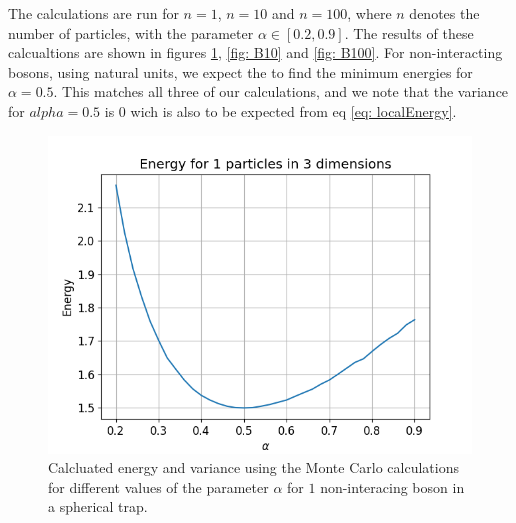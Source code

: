 \documentclass[a4paper, 10pt, english]{revtex4-2} %
\begin{document}
    The calculations are run for $n = 1$, $n = 10$ and $n=100$, where $n$ denotes the number of particles, with the parameter $\alpha \in [0.2, 0.9]$.
    The results of these calcualtions are shown in figures \ref{fig: B1}, \ref{fig: B10} and \ref{fig: B100}.
    For non-interacting bosons, using natural units, we expect the to find the minimum energies for $\alpha = 0.5$.
    This matches all three of our calculations, and we note that the variance for $alpha = 0.5$ is $0$ wich is also to be expected from eq \ref*{eq: localEnergy}.
    \def\imwidth{0.49\textwidth}
    \begin{figure}[!ht]
        \centering
        \includegraphics{figures/Energy_B_1.png}
        \caption{Calcluated energy and variance using the Monte Carlo calculations for different values of the parameter $\alpha$ for $1$ non-interacing boson in a spherical trap.}
        \label{fig: B1}
    \end{figure}
\end{document}
